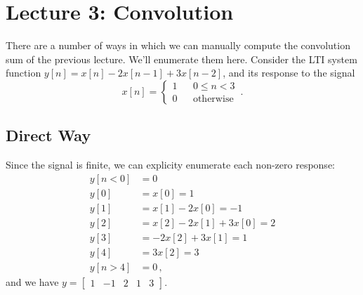\section{Lecture 3: Convolution}

There are a number of ways in which we can manually compute the convolution
sum of the previous lecture. We'll enumerate them here. Consider the LTI system
function $y[n] = x[n] - 2x[n-1] + 3x[n-2]$, and its response to the signal
%
\begin{displaymath}
  x[n] = \left\{\begin{array}{ccl}
  1 & & 0 \leq n < 3 \\
  0 & & \mathrm{otherwise}
  \end{array}\right. \,.
\end{displaymath}

\subsection{Direct Way}
%
Since the signal is finite, we can explicity enumerate each non-zero response:
%
\begin{align*}
  y[n<0] &= 0 \\
  y[0] &= x[0] = 1 \\
  y[1] &= x[1] - 2x[0] = -1 \\
  y[2] &= x[2] - 2x[1] + 3x[0] = 2 \\
  y[3] &= -2x[2] + 3x[1] = 1 \\
  y[4] &= 3x[2] = 3 \\
  y[n>4] &= 0 \,,
\end{align*}
%
and we have $y = \left[\begin{array}{ccccc}1 & -1 & 2 & 1 & 3\end{array}\right]$.


